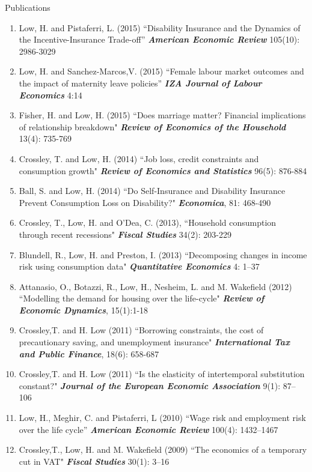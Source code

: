 \documentclass{resume} %
\begin{document}
\begin{rSection}{Publications}
\begin{enumerate}
\item Low, H. and Pistaferri, L. (2015) ``Disability Insurance and the Dynamics of the Incentive-Insurance Trade-off” \textit{\textbf{American Economic Review}}  105(10): 2986-3029

\item Low, H. and Sanchez-Marcos,V. (2015) ``Female labour market outcomes and the impact of maternity leave policies” \textit{\textbf{IZA Journal of Labour Economics}} 4:14
\item Fisher, H. and Low, H. (2015) ``Does marriage matter? Financial implications of relationship breakdown" \textit{\textbf{Review of Economics of the Household}} 13(4): 735-769
\item Crossley, T. and Low, H. (2014) ``Job loss, credit constraints and consumption growth" \textit{\textbf{Review of Economics and Statistics}} 96(5): 876-884
\item Ball, S. and Low, H. (2014) ``Do Self-Insurance and Disability Insurance Prevent Consumption Loss on Disability?" \textit{\textbf{Economica}}, 81: 468-490
\item Crossley, T., Low, H. and O'Dea, C. (2013), ``Household consumption through recent recessions" \textit{\textbf{Fiscal Studies}} 34(2): 203-229 
\item Blundell, R., Low, H. and Preston, I. (2013) ``Decomposing changes in income risk using consumption data" \textit{\textbf{Quantitative Economics}} 4: 1--37
\item Attanasio, O., Botazzi, R., Low, H., Nesheim, L. and M. Wakefield (2012) ``Modelling the demand for housing over the life-cycle" \textit{\textbf{Review of Economic Dynamics}}, 15(1):1-18 
\item Crossley,T. and H. Low (2011) ``Borrowing constraints, the cost of precautionary saving, and unemployment insurance" \textit{\textbf{International Tax and Public Finance}}, 18(6): 658-687
\item Crossley,T. and H. Low (2011) ``Is the elasticity of intertemporal substitution constant?" \textit{\textbf{Journal of the European Economic Association}} 9(1): 87--106

\item Low, H., Meghir, C. and Pistaferri, L (2010) ``Wage risk and employment risk over the life cycle” \textit{\textbf{American Economic Review}} 100(4): 1432--1467
\item Crossley,T., Low, H. and M. Wakefield (2009) ``The economics of a temporary cut in VAT" \textit{\textbf{Fiscal Studies}} 30(1): 3--16


\end{enumerate}
\end{rSection}
\end{document}
